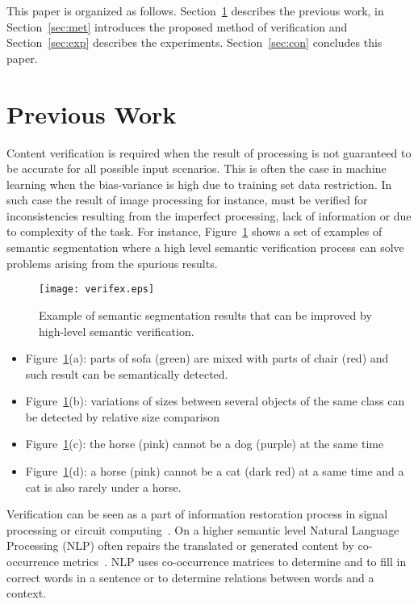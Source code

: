 \documentclass[conference]{IEEEtran}
\begin{document}
This paper is organized as follows. Section~\ref{sec:pre} describes the previous work, in Section~\ref{sec:met} introduces the proposed method of verification and Section~\ref{sec:exp} describes the experiments. Section~\ref{sec:con} concludes this paper. 








\section{Previous Work}
\label{sec:pre}

Content verification is required when the result of processing is not guaranteed to be accurate for all possible input scenarios. This is often the case in machine learning when the bias-variance is high due to training set data restriction. In such case the result of image processing for instance, must be verified for inconsistencies resulting from the imperfect processing, lack of information or due to complexity of the task.  For instance, Figure~\ref{fig:verifex} shows a set of examples of semantic segmentation where a high level semantic verification process can solve problems arising from the spurious results. 
\begin{figure}[bht]
\centering
	\texttt{[image: verifex.eps]}
	\caption{\label{fig:verifex} Example of semantic segmentation results that can be improved by high-level semantic verification. }
\end{figure}
\begin{itemize}
	\item Figure~\ref{fig:verifex}(a): parts of sofa (green) are mixed with parts of chair (red) and such result can be semantically detected. 
	\item Figure~\ref{fig:verifex}(b): variations of sizes between several objects of the same class can be detected by relative size comparison
	\item Figure~\ref{fig:verifex}(c): the horse (pink) cannot be a dog (purple) at the same time
	\item Figure~\ref{fig:verifex}(d): a horse (pink) cannot be a cat (dark red) at a same time and a cat  is also rarely under a horse. 
\end{itemize}
Verification can be seen as a part of information restoration process in signal processing or circuit computing~\cite{moon:05}. On a higher semantic level Natural Language Processing (NLP) often repairs the translated or generated content by co-occurrence metrics~\cite{bordag:08,baroni:10,hai:11,levy:14}. NLP uses co-occurrence matrices to determine and to fill in correct words in a sentence or to determine relations between words and a context.
\end{document}
